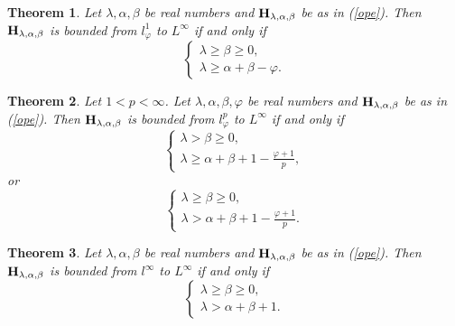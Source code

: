 \documentclass[10pt]{amsart}
\newtheorem{theorem}{Theorem}[section]
\theoremstyle{definition}    %
\numberwithin{equation}{section}
\begin{document}
\begin{theorem}\label{m-th-2}
Let $\lambda, \alpha, \beta$ be real numbers and ${\bf H}_{\lambda, \alpha, \beta}$ be as in (\ref{ope}). Then ${\bf H}_{\lambda, \alpha, \beta}$ is bounded from
$l_{\varphi}^1$ to $L^{\infty}$ if and only if 
\begin{equation}\label{th-2-1}
\begin{cases}
\lambda\geq \beta\geq 0, \\
\lambda\geq \alpha+\beta-\varphi.\nonumber
\end{cases}
\end{equation}
\end{theorem}

\begin{theorem}\label{m-th-3}
Let $1<p<\infty$. Let $\lambda, \alpha, \beta, \varphi$ be real numbers and ${\bf H}_{\lambda, \alpha, \beta}$ be as in (\ref{ope}). Then ${\bf H}_{\lambda, \alpha, \beta}$ is bounded from
$l_{\varphi}^p$ to $L^{\infty}$ if and only if 
\begin{equation} 
\begin{cases}
\lambda>\beta\geq 0, \\
\lambda\geq \alpha+\beta+1-\frac{\varphi+1}{p}, \nonumber
\end{cases}
\end{equation}
or
\begin{equation} 
\begin{cases}
\lambda\geq \beta\geq 0, \\
\lambda>\alpha+\beta+1-\frac{\varphi+1}{p}. \nonumber
\end{cases}
\end{equation}
\end{theorem}

\begin{theorem}\label{m-th-3-1}
Let $\lambda, \alpha, \beta$ be real numbers and ${\bf H}_{\lambda, \alpha, \beta}$ be as in (\ref{ope}). Then ${\bf H}_{\lambda, \alpha, \beta}$ is bounded from
$l^\infty$ to $L^{\infty}$ if and only if 
\begin{equation}
\begin{cases}
\lambda\geq \beta\geq 0, \\
\lambda>\alpha+\beta+1. \nonumber
\end{cases}
\end{equation}
\end{theorem}
\end{document}
